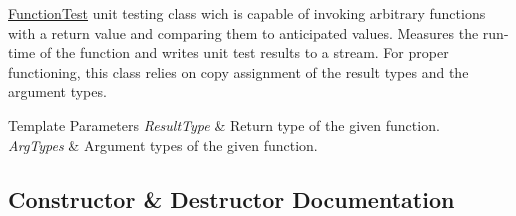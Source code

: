 \hyperlink{classunittest_1_1_function_test}{Function\+Test} unit testing class wich is capable of invoking arbitrary functions with a return value and comparing them to anticipated values. Measures the run-\/time of the function and writes unit test results to a stream. For proper functioning, this class relies on copy assignment of the result types and the argument types. 
\begin{DoxyTemplParams}{Template Parameters}
{\em Result\+Type} & Return type of the given function. \\
\hline
{\em Arg\+Types} & Argument types of the given function. \\
\hline
\end{DoxyTemplParams}


\subsection{Constructor \& Destructor Documentation}
